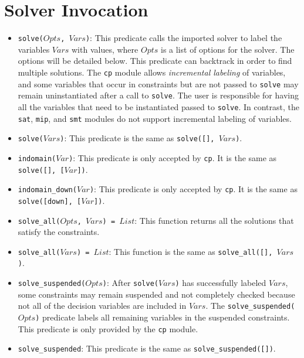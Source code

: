 \section{Solver Invocation}
\begin{itemize}
\item \texttt{solve($Opts$, $Vars$)}: This predicate calls the imported solver to label the variables $Vars$ with values, where $Opts$ is a list of options for the solver. The options will be detailed below. This predicate can backtrack in order to find multiple solutions. The \texttt{cp} module allows \textit{incremental labeling} of variables, and some variables that occur in constraints but are not passed to \texttt{solve} may remain uninstantiated after a call to \texttt{solve}. The user is responsible for having all the variables that need to be instantiated passed to \texttt{solve}. In contrast, the \texttt{sat}, \texttt{mip}, and \texttt{smt} modules do not support incremental labeling of variables.

\item\texttt{solve($Vars$)}: This predicate is the same as \texttt{solve([], $Vars$)}. 
\item \texttt{indomain($Var$)}: This predicate is only accepted by \texttt{cp}. It is the same as \texttt{solve([], [$Var$])}.
\item \texttt{indomain\_down($Var$)}: This predicate is only accepted by \texttt{cp}. It is the same as \newline \texttt{solve([down], [$Var$])}. 
\item \texttt{solve\_all($Opts$, $Vars$) = $List$}: This function returns all the solutions that satisfy the constraints.
\item \texttt{solve\_all($Vars$) = $List$}: This function is the same as \texttt{solve\_all([], $Vars$)}.
\item \texttt{solve\_suspended($Opts$)}: After \texttt{solve($Vars$)} has successfully labeled $Vars$, some constraints may remain suspended and not completely checked because not all of the decision variables are included in $Vars$. The \texttt{solve\_suspended($Opts$)} predicate labels all remaining variables in the suspended constraints. This predicate is only provided by the \texttt{cp} module. 
\item \texttt{solve\_suspended}: This predicate is the same as \texttt{solve\_suspended([])}.
\end{itemize}


